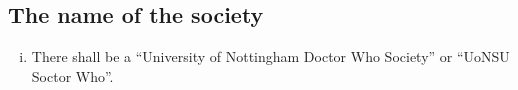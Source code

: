 \subsection{The name of the society}
\begin{enumerate}[i.]
    \item There shall be a “University of Nottingham Doctor Who Society” or “UoNSU Soctor Who”.
\end{enumerate}